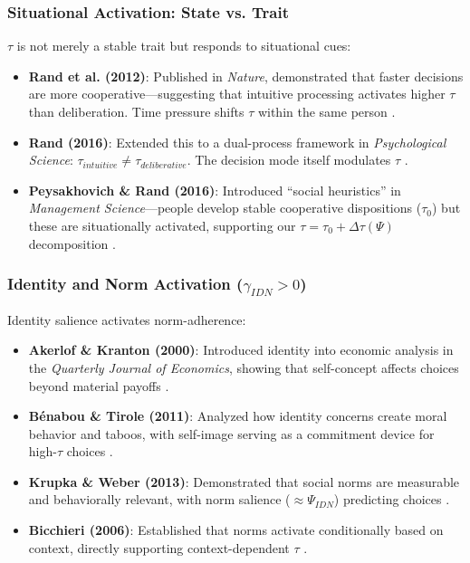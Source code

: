 \subsubsection{Situational Activation: State vs. Trait}

$\tau$ is not merely a stable trait but responds to situational cues:

\begin{itemize}
\item \textbf{Rand et al. (2012)}: Published in \textit{Nature}, demonstrated that faster decisions are more cooperative---suggesting that intuitive processing activates higher $\tau$ than deliberation. Time pressure shifts $\tau$ within the same person \cite{rand2012}.

\item \textbf{Rand (2016)}: Extended this to a dual-process framework in \textit{Psychological Science}: $\tau_{intuitive} \neq \tau_{deliberative}$. The decision mode itself modulates $\tau$ \cite{rand2016}.

\item \textbf{Peysakhovich \& Rand (2016)}: Introduced ``social heuristics'' in \textit{Management Science}---people develop stable cooperative dispositions ($\tau_0$) but these are situationally activated, supporting our $\tau = \tau_0 + \Delta\tau(\Psi)$ decomposition \cite{peysakhovich2016}.
\end{itemize}

\subsubsection{Identity and Norm Activation ($\gamma_{IDN} > 0$)}

Identity salience activates norm-adherence:

\begin{itemize}
\item \textbf{Akerlof \& Kranton (2000)}: Introduced identity into economic analysis in the \textit{Quarterly Journal of Economics}, showing that self-concept affects choices beyond material payoffs \cite{akerlof2000}.

\item \textbf{Bénabou \& Tirole (2011)}: Analyzed how identity concerns create moral behavior and taboos, with self-image serving as a commitment device for high-$\tau$ choices \cite{benabou2011}.

\item \textbf{Krupka \& Weber (2013)}: Demonstrated that social norms are measurable and behaviorally relevant, with norm salience ($\approx \Psi_{IDN}$) predicting choices \cite{krupka2013}.

\item \textbf{Bicchieri (2006)}: Established that norms activate conditionally based on context, directly supporting context-dependent $\tau$ \cite{bicchieri2006}.
\end{itemize}

